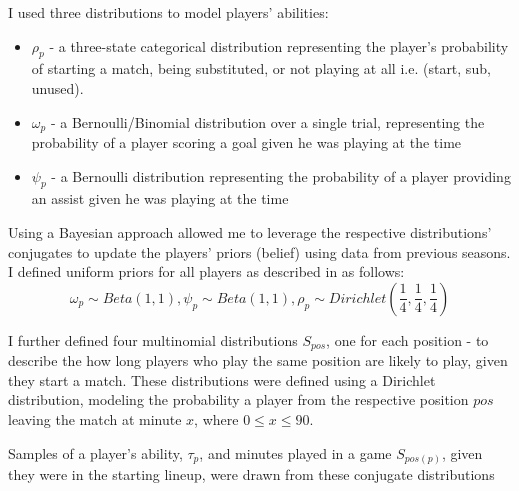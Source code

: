 I used three distributions to model players' abilities:
\begin{itemize}
    \item $\rho_p$ - a three-state categorical distribution representing the player's probability of starting a match, being substituted, or not playing at all i.e. (start, sub, unused).
    \item $\omega_p$ - a Bernoulli/Binomial distribution over a single trial, representing the probability of a player scoring a goal given he was playing at the time
    \item $\psi_p$ - a Bernoulli distribution representing the probability of a player providing an assist given he was playing at the time
\end{itemize}
Using a Bayesian approach allowed me to leverage the respective distributions' conjugates to update the players' priors (belief) using data from previous seasons. I defined uniform priors for all players as described in \cite{matthews2012} as follows: $$\omega_p \sim Beta(1, 1), \psi_p \sim Beta(1, 1),  \rho_p \sim Dirichlet(\frac{1}{4}, \frac{1}{4}, \frac{1}{4})$$

I further defined four multinomial distributions $S_{pos}$, one for each position - to describe the how long players who play the same position are likely to play, given they start a match. These distributions were defined using a Dirichlet distribution, modeling the probability a player from the respective position $pos$ leaving the match at minute $x$, where $0 \le x \le 90$. 

Samples of a player's ability, $\tau_p$, and minutes played in a game $S_{pos(p)}$, given they were in the starting lineup, were drawn from these conjugate distributions

